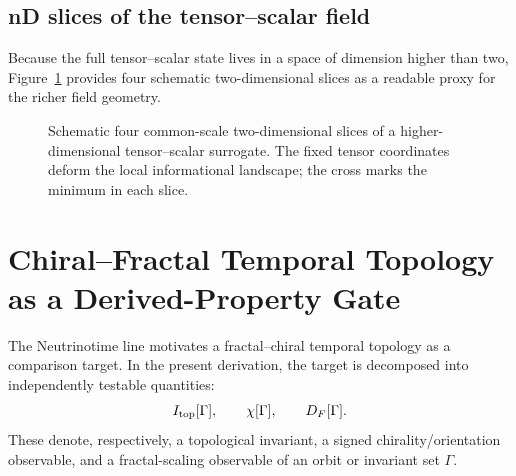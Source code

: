 \documentclass[11pt]{book}
\begin{document}
\section{nD slices of the tensor--scalar field}
Because the full tensor--scalar state lives in a space of dimension higher than two, Figure~\ref{fig:nd-slices} provides four schematic two-dimensional slices as a readable proxy for the richer field geometry.
\begin{figure}[H]
  \centering
  \caption{Schematic four common-scale two-dimensional slices of a higher-dimensional tensor--scalar surrogate. The fixed tensor coordinates deform the local informational landscape; the cross marks the minimum in each slice.}
  \label{fig:nd-slices}
\end{figure}

\chapter[Chiral--Fractal Temporal Topology]{Chiral--Fractal Temporal Topology as a Derived-Property Gate}
The Neutrinotime line motivates a fractal--chiral temporal topology as a comparison target. In the present derivation, the target is decomposed into independently testable quantities:
\[
I_{\rm top}[\Gamma],\qquad \chi[\Gamma],\qquad D_F[\Gamma].
\]
These denote, respectively, a topological invariant, a signed chirality/orientation observable, and a fractal-scaling observable of an orbit or invariant set \(\Gamma\).
\end{document}
